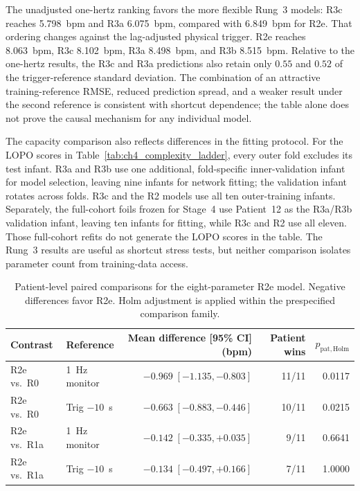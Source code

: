 The unadjusted one-hertz ranking favors the more flexible Rung~3 models: R3c reaches
5.798~bpm and R3a 6.075~bpm, compared with 6.849~bpm for R2e. That ordering changes against
the lag-adjusted physical trigger. R2e reaches 8.063~bpm, R3c 8.102~bpm, R3a 8.498~bpm, and
R3b 8.515~bpm. Relative to the one-hertz results, the R3c and R3a predictions also retain only
$0.55$ and $0.52$ of the trigger-reference standard deviation. The combination of an attractive
training-reference RMSE, reduced prediction spread, and a weaker result under the second
reference is consistent with shortcut dependence; the table alone does not prove the causal
mechanism for any individual model.

The capacity comparison also reflects differences in the fitting protocol. For the LOPO scores in
Table~\ref{tab:ch4_complexity_ladder}, every outer fold excludes its test infant. R3a and R3b use
one additional, fold-specific inner-validation infant for model selection, leaving nine infants
for network fitting; the validation infant rotates across folds. R3c and the R2 models use all ten
outer-training infants. Separately, the full-cohort foils frozen for Stage~4 use Patient~12 as the
R3a/R3b validation infant, leaving ten infants for fitting, while R3c and R2 use all eleven. Those
full-cohort refits do not generate the LOPO scores in the table. The Rung~3 results are useful as
shortcut stress tests, but neither comparison isolates parameter count from training-data access.

\begin{table}[htbp]
  \centering
  \small
  \caption{Patient-level paired comparisons for the eight-parameter R2e model. Negative
  differences favor R2e. Holm adjustment is applied within the prespecified comparison family.}
  \label{tab:ch4_r2e_inference}
  \begin{tabularx}{\textwidth}{@{}lXrrr@{}}
    \toprule
    Contrast & Reference & Mean difference [95\% CI] (bpm) & Patient wins & $p_{\mathrm{pat,Holm}}$ \\
    \midrule
    R2e vs.\ R0 & 1~Hz monitor & $-0.969\;[-1.135,-0.803]$ & 11/11 & 0.0117 \\
    R2e vs.\ R0 & Trig $-10$~s & $-0.663\;[-0.883,-0.446]$ & 10/11 & 0.0215 \\
    R2e vs.\ R1a & 1~Hz monitor & $-0.142\;[-0.335,+0.035]$ & 9/11 & 0.6641 \\
    R2e vs.\ R1a & Trig $-10$~s & $-0.134\;[-0.497,+0.166]$ & 7/11 & 1.0000 \\
    \bottomrule
  \end{tabularx}
\end{table}

